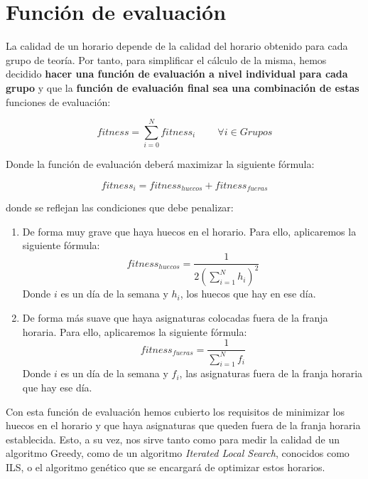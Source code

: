 \section{Función de evaluación}
La calidad de un horario depende de la calidad del horario obtenido para cada grupo de teoría. Por tanto, para simplificar el cálculo de la misma, hemos decidido \textbf{hacer una función de evaluación a nivel individual para cada grupo} y que la \textbf{función de evaluación final sea una combinación de estas} funciones de evaluación:

\begin{displaymath}
    fitness = \sum_{i=0}^N fitness_i \qquad\ \forall i \in Grupos
\end{displaymath}

Donde la función de evaluación deberá maximizar la siguiente fórmula:

\begin{displaymath}
    fitness_i = fitness_{huecos} + fitness_{fueras}
\end{displaymath}

donde se reflejan las condiciones que debe penalizar:

\begin{enumerate}[---]
    \item De forma muy grave que haya huecos en el horario. Para ello, aplicaremos la siguiente fórmula:
    \begin{displaymath}
        fitness_{huecos} = \frac{1}{2 \left( \sum_{i = 1}^N h_i \right)^2}
    \end{displaymath}
    Donde $i$ es un día de la semana y $h_i$, los huecos que hay en ese día.
    
    \item De forma más suave que haya asignaturas colocadas fuera de la franja horaria. Para ello, aplicaremos la siguiente fórmula:
    \begin{displaymath}
        fitness_{fueras} = \frac{1}{\sum_{i=1}^N f_i}
    \end{displaymath}
    Donde $i$ es un día de la semana y $f_i$, las asignaturas fuera de la franja horaria que hay ese día.
\end{enumerate}

Con esta función de evaluación hemos cubierto los requisitos de minimizar los huecos en el horario y que haya asignaturas que queden fuera de la franja horaria establecida. Esto, a su vez, nos sirve tanto como para medir la calidad de un algoritmo Greedy, como de un algoritmo \textit{Iterated Local Search}, conocidos como ILS, o el algoritmo genético que se encargará de optimizar estos horarios.
